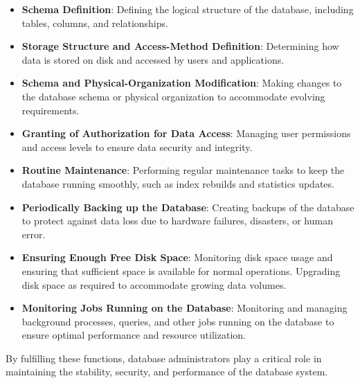 \documentclass{article}
\begin{document}
\begin{itemize}
    \item \textbf{Schema Definition}: Defining the logical structure of the database, including tables, columns, and relationships.
    
    \item \textbf{Storage Structure and Access-Method Definition}: Determining how data is stored on disk and accessed by users and applications.
    
    \item \textbf{Schema and Physical-Organization Modification}: Making changes to the database schema or physical organization to accommodate evolving requirements.
    
    \item \textbf{Granting of Authorization for Data Access}: Managing user permissions and access levels to ensure data security and integrity.
    
    \item \textbf{Routine Maintenance}: Performing regular maintenance tasks to keep the database running smoothly, such as index rebuilds and statistics updates.
    
    \item \textbf{Periodically Backing up the Database}: Creating backups of the database to protect against data loss due to hardware failures, disasters, or human error.
    
    \item \textbf{Ensuring Enough Free Disk Space}: Monitoring disk space usage and ensuring that sufficient space is available for normal operations. Upgrading disk space as required to accommodate growing data volumes.
    
    \item \textbf{Monitoring Jobs Running on the Database}: Monitoring and managing background processes, queries, and other jobs running on the database to ensure optimal performance and resource utilization.
\end{itemize}

By fulfilling these functions, database administrators play a critical role in maintaining the stability, security, and performance of the database system.
\end{document}
